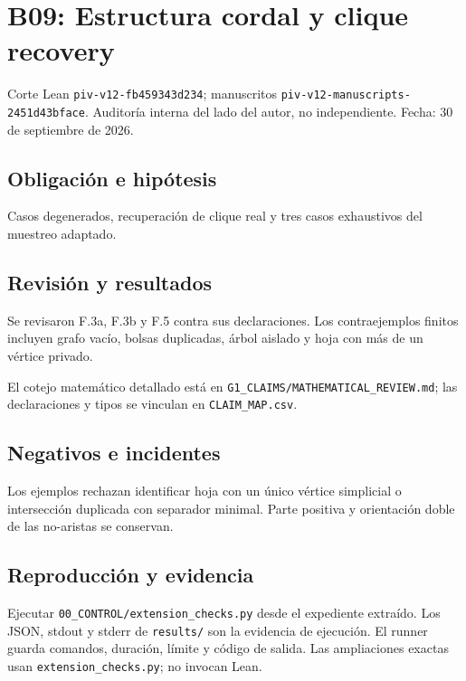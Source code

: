 \documentclass[11pt]{article}
\begin{document}
\section{B09: Estructura cordal y clique
recovery}\label{b09-estructura-cordal-y-clique-recovery}

Corte Lean \nolinkurl{piv-v12-fb459343d234}; manuscritos
\nolinkurl{piv-v12-manuscripts-2451d43bface}. Auditoría interna del lado
del autor, no independiente. Fecha: 30 de septiembre de 2026.

\subsection{Obligación e hipótesis}\label{obligaciuxf3n-e-hipuxf3tesis}

Casos degenerados, recuperación de clique real y tres casos exhaustivos
del muestreo adaptado.

\subsection{Revisión y resultados}\label{revisiuxf3n-y-resultados}

Se revisaron F.3a, F.3b y F.5 contra sus declaraciones. Los
contraejemplos finitos incluyen grafo vacío, bolsas duplicadas, árbol
aislado y hoja con más de un vértice privado.

El cotejo matemático detallado está en
\nolinkurl{G1_CLAIMS/MATHEMATICAL_REVIEW.md}; las declaraciones y tipos
se vinculan en \nolinkurl{CLAIM_MAP.csv}.

\subsection{Negativos e incidentes}\label{negativos-e-incidentes}

Los ejemplos rechazan identificar hoja con un único vértice simplicial o
intersección duplicada con separador minimal. Parte positiva y
orientación doble de las no-aristas se conservan.

\subsection{Reproducción y evidencia}\label{reproducciuxf3n-y-evidencia}

Ejecutar \nolinkurl{00_CONTROL/extension_checks.py} desde el expediente
extraído. Los JSON, stdout y stderr de \nolinkurl{results/} son la
evidencia de ejecución. El runner guarda comandos, duración, límite y
código de salida. Las ampliaciones exactas usan
\nolinkurl{extension_checks.py}; no invocan Lean.
\end{document}
